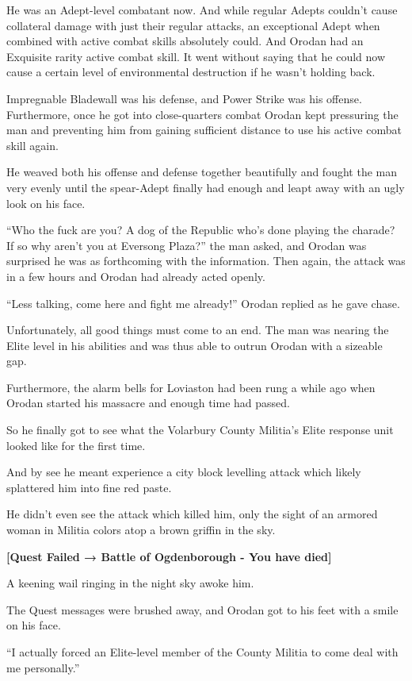\documentclass[a4paper,10pt]{book}
\begin{document}
He was an Adept-level combatant now. And while regular Adepts couldn’t cause collateral damage with just their regular attacks, an exceptional Adept when combined with active combat skills absolutely could. And Orodan had an Exquisite rarity active combat skill. It went without saying that he could now cause a certain level of environmental destruction if he wasn’t holding back.\par
Impregnable Bladewall was his defense, and Power Strike was his offense. Furthermore, once he got into close-quarters combat Orodan kept pressuring the man and preventing him from gaining sufficient distance to use his active combat skill again.\par
He weaved both his offense and defense together beautifully and fought the man very evenly until the spear-Adept finally had enough and leapt away with an ugly look on his face.\par
“Who the fuck are you? A dog of the Republic who’s done playing the charade? If so why aren’t you at Eversong Plaza?” the man asked, and Orodan was surprised he was as forthcoming with the information. Then again, the attack was in a few hours and Orodan had already acted openly.\par
“Less talking, come here and fight me already!” Orodan replied as he gave chase.\par
Unfortunately, all good things must come to an end. The man was nearing the Elite level in his abilities and was thus able to outrun Orodan with a sizeable gap.\par
Furthermore, the alarm bells for Loviaston had been rung a while ago when Orodan started his massacre and enough time had passed.\par
So he finally got to see what the Volarbury County Militia’s Elite response unit looked like for the first time.\par
And by see he meant experience a city block levelling attack which likely splattered him into fine red paste.\par
He didn’t even see the attack which killed him, only the sight of an armored woman in Militia colors atop a brown griffin in the sky.\par
\textbf{[Quest Failed → Battle of Ogdenborough - You have died]}\par
A keening wail ringing in the night sky awoke him.\par
The Quest messages were brushed away, and Orodan got to his feet with a smile on his face.\par
“I actually forced an Elite-level member of the County Militia to come deal with me personally.”\par
\end{document}
